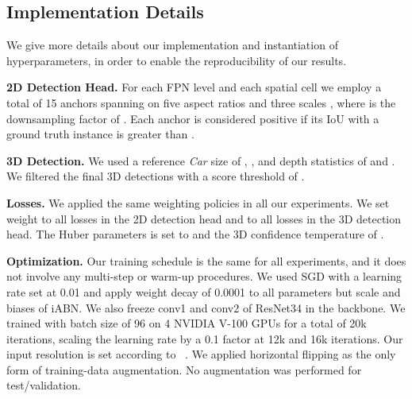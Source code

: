 \documentclass[10pt,twocolumn,letterpaper]{article}
\newcommand{\iABN}{iABN\xspace}
\renewcommand{\paragraph}[1]{

        \vspace{3pt}
	\noindent\textbf{#1}}
\begin{document}
\subsection{Implementation Details}
\label{sec:details}

We give more details about our implementation and instantiation of hyperparameters, in order to enable the reproducibility of our results.

\paragraph{2D Detection Head.} For each FPN level  and each spatial cell  we employ a total of 15 anchors spanning on five aspect ratios  and three scales , where  is the downsampling factor of . Each anchor is considered positive if its IoU with a ground truth instance is greater than . 

\paragraph{3D Detection.} We used a reference \textit{Car} size of , ,  and depth statistics of  and . We filtered the final 3D detections with a score threshold of . 

\paragraph{Losses.} We applied the same weighting policies in all our experiments. We set weight  to all losses in the 2D detection head and  to all losses in the 3D detection head.
The Huber parameters is set to  and the 3D confidence temperature of .

\paragraph{Optimization.} Our training schedule is the same for all experiments, and it does not involve any multi-step or warm-up procedures. We used SGD with a learning rate set at 0.01 and apply weight decay of 0.0001 to all parameters but scale and biases of \iABN. We also freeze conv1 and conv2 of ResNet34 in the backbone. We trained with batch size of 96 on 4 NVIDIA V-100 GPUs for a total of 20k iterations, scaling the learning rate by a 0.1 factor at 12k and 16k iterations. Our input resolution is set according to ~\cite{Manhardt_2019_CVPR}. We applied horizontal flipping as the only form of training-data augmentation. No augmentation was performed for test/validation.
\end{document}
